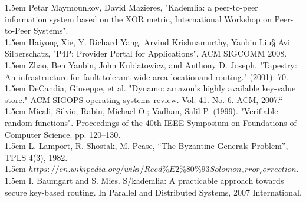 \documentclass[10pt,a4paper]{article}
\begin{document}
\begin{thebibliography}{99}
\hangindent 1.5em
\noindent  
{}Petar Maymounkov, David Mazieres, "Kademlia: a peer-to-peer information system based on the XOR metric, International Workshop on Peer-to-Peer Systems".
  \vspace{-1em}
\\

\hangindent 1.5em
\noindent  
{} Haiyong Xie, Y. Richard Yang, Arvind Krishnamurthy, Yanbin Liu§ Avi Silberschatz, "P4P: Provider Portal for Applications", ACM SIGCOMM 2008.
  \vspace{-1em}
\\

\hangindent 1.5em
\noindent  
{}Zhao, Ben Yanbin, John Kubiatowicz, and Anthony D. Joseph. "Tapestry: An infrastructure for fault-tolerant wide-area locationand routing." (2001): 70.
  \vspace{-1em}
\\

\hangindent 1.5em
\noindent  
{} DeCandia, Giuseppe, et al. "Dynamo: amazon's highly available key-value store." ACM SIGOPS operating systems review. Vol. 41. No. 6. ACM, 2007.“
  \vspace{-1em}
\\

\hangindent 1.5em
\noindent  
{} Micali, Silvio; Rabin, Michael O.; Vadhan, Salil P. (1999). "Verifiable random functions". Proceedings of the 40th IEEE Symposium on Foundations of Computer Science. pp. 120–130.
  \vspace{-1em}
\\

\hangindent 1.5em
\noindent  
{} L. Lamport, R. Shostak, M. Pease, “The Byzantine Generals Problem”, TPLS 4(3), 1982.
  \vspace{-1em}
\\

\hangindent 1.5em
\noindent  
{}$ https://en.wikipedia.org/wiki/Reed\%E2\%80\%93Solomon_error_correction$.
  \vspace{-1em}
\\

\hangindent 1.5em
\noindent  
{}  I. Baumgart and S. Mies. S/kademlia: A practicable approach towards secure key-based routing. In Parallel and Distributed Systems, 2007 International.
  \vspace{-1em}
\\


\end{thebibliography}
\end{document}
